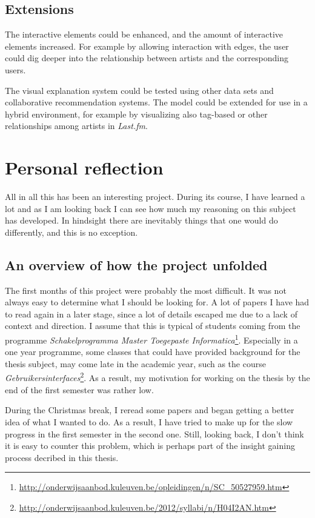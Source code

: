 \subsection{Extensions}

The interactive elements could be enhanced, and the amount of interactive elements increased. For example by allowing interaction with edges, the user could dig deeper into the relationship between artists and the corresponding users.

The visual explanation system could be tested using other data sets and collaborative recommendation systems. The model could be extended for use in a hybrid environment, for example by visualizing also tag-based or other relationships among artists in \emph{Last.fm}.


\section{Personal reflection}

All in all this has been an interesting project. During its course, I have learned a lot and as I am looking back I can see how much my reasoning on this subject has developed. In hindsight there are inevitably things that one would do differently, and this is no exception.

\subsection{An overview of how the project unfolded}

The first months of this project were probably the most difficult. It was not always easy to determine what I should be looking for. A lot of papers I have had to read again in a later stage, since a lot of details escaped me due to a lack of context and direction. I assume that this is typical of students coming from the programme \emph{Schakelprogramma Master Toegepaste Informatica}\footnote{\url{http://onderwijsaanbod.kuleuven.be/opleidingen/n/SC_50527959.htm}}. Especially in a one year programme, some classes that could have provided background for the thesis subject, may come late in the academic year, such as the course \emph{Gebruikersinterfaces}\footnote{\url{http://onderwijsaanbod.kuleuven.be/2012/syllabi/n/H04I2AN.htm}}. As a result, my motivation for working on the thesis by the end of the first semester was rather low.

During the Christmas break, I reread some papers and began getting a better idea of what I wanted to do. As a result, I have tried to make up for the slow progress in the first semester in the second one. Still, looking back, I don't think it is easy to counter this problem, which is perhaps part of the insight gaining process decribed in this thesis.


